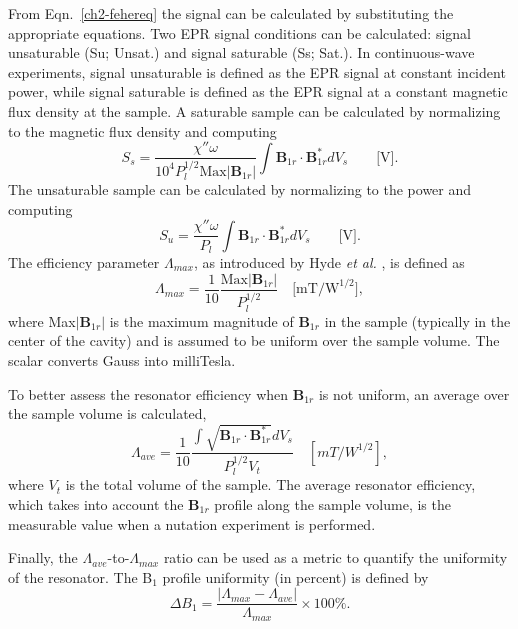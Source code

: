 From Eqn.~\ref{ch2-fehereq} the signal can be calculated by substituting the appropriate equations. Two EPR signal conditions can be calculated: signal unsaturable (Su; Unsat.) and signal saturable (Ss; Sat.). In continuous-wave experiments, signal unsaturable is defined as the EPR signal at constant incident power, while signal saturable is defined as the EPR signal at a constant magnetic flux density at the sample. A saturable sample can be calculated by normalizing to the magnetic flux density and computing
\begin{equation}
    S_s = \frac{\chi'' \omega}{10^4 P_l^{1/2} \text{Max}|\mathbf{B}_{1r}|} \int \mathbf{B}_{1r} \cdot \mathbf{B}_{1r}^* dV_s \qquad \text{[V]}. \label{ch2-eq:ss}
\end{equation}{}
The unsaturable sample can be calculated by normalizing to the power and computing
\begin{equation}
    S_u = \frac{\chi'' \omega}{P_l} \int \mathbf{B}_{1r} \cdot \mathbf{B}_{1r}^* dV_s \qquad  \text{[V]}. \label{ch2-eq:su}
\end{equation}{}
The efficiency parameter $\Lambda_{max}$, as introduced by Hyde {\em et al.} \cite{hydehoff}, is defined as
\begin{equation}
    \Lambda_{max} = \frac{1}{10}\frac{\text{Max}|\mathbf{B}_{1r}|}{P_l^{1/2}} \quad \text{[mT/W}^{1/2}], \label{ch2-eq:lammax}
\end{equation}
where Max$|\mathbf{B}_{1r}|$ is the maximum magnitude of $\mathbf{B}_{1r}$ in the sample (typically in the center of the cavity) and is assumed to be uniform over the sample volume. \cite{hydehoff} The scalar converts Gauss into milliTesla. 

To better assess the resonator efficiency when $\mathbf{B}_{1r}$ is not uniform, an average over the sample volume is calculated, 
\begin{equation}
    \Lambda_{ave} = \frac{1}{10}\frac{\int \sqrt{\mathbf{B}_{1r} \cdot \mathbf{B}_{1r}^*} dV_s}{P_l^{1/2} V_t} \quad [mT/W^{1/2}], \label{ch2-eq:lamave}
\end{equation}
where $V_t$ is the total volume of the sample. The average resonator efficiency, which takes into account the $\mathbf{B}_{1r}$ profile along the sample volume, is the measurable value when a nutation experiment is performed.

Finally, the $\Lambda_{ave}$-to-$\Lambda_{max}$ ratio can be used as a metric to quantify the uniformity of the resonator. \cite{UFLGR2017} The B$_1$ profile uniformity (in percent) is defined by 
\begin{equation}
    \Delta B_1 = \frac{\left| \Lambda_{max} - \Lambda_{ave} \right|}{\Lambda_{max}} \times 100\%.
\end{equation}


